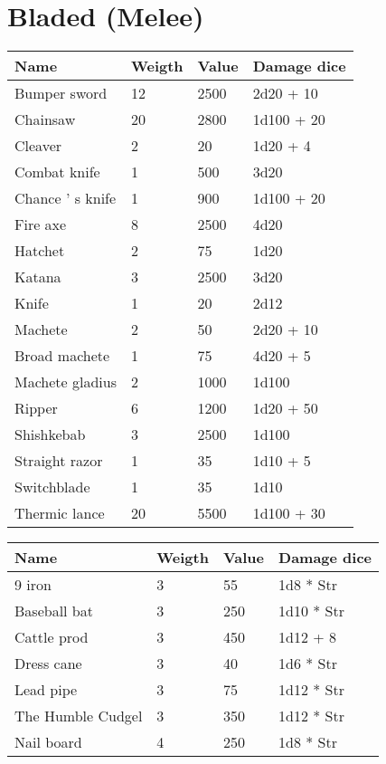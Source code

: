 \documentclass{report}
\begin{document}
\begin{table}[H]
\begin{table}[H]
\begin{table}[H]
\begin{table}[H]
\begin{table}[H]
\begin{table}[H]
\begin{table}[H]
\begin{table}[H]
\begin{table}[H]
\begin{table}[H]
\begin{table}[H]
\chapter{Bladed (Melee)}
\begin{table}[H]
  \centering
  \begin{tabular}{p{30mm}p{30mm}p{30mm}p{30mm}}
\bfseries Name & \bfseries Weigth & \bfseries Value & \bfseries Damage dice \\
\hline
Bumper sword  & 12 & 2500 & 2d20 + 10 \\
Chainsaw & 20 & 2800 & 1d100 + 20 \\
Cleaver  & 2 & 20 & 1d20 + 4 \\
Combat knife  & 1 & 500 & 3d20 \\
Chance ' s knife  & 1 & 900 & 1d100 + 20 \\
Fire axe  & 8 & 2500 & 4d20 \\
Hatchet  & 2 & 75 & 1d20 \\
Katana  & 3 & 2500 & 3d20 \\
Knife  & 1 & 20 & 2d12 \\
Machete  & 2 & 50 & 2d20 + 10 \\
Broad machete  & 1 & 75 & 4d20 + 5 \\
Machete gladius  & 2 & 1000 & 1d100  \\
Ripper  & 6 & 1200 & 1d20 + 50 \\
Shishkebab  & 3 & 2500 & 1d100 \\
Straight razor  & 1 & 35 & 1d10 + 5 \\
Switchblade  & 1 & 35 & 1d10 \\
Thermic lance  & 20 & 5500 & 1d100 + 30 \\
  \end{tabular}
\begin{table}[H]
  \centering
  \begin{tabular}{p{30mm}p{30mm}p{30mm}p{30mm}}
\bfseries Name & \bfseries Weigth & \bfseries Value & \bfseries Damage dice \\
\hline
9 iron  & 3 & 55 & 1d8 * Str \\
Baseball bat & 3 & 250 & 1d10 * Str \\
Cattle prod  & 3 & 450 & 1d12 + 8 \\
Dress cane  & 3 & 40 & 1d6 * Str \\
Lead pipe  & 3 & 75 & 1d12 * Str \\
The Humble Cudgel  & 3 & 350 & 1d12 * Str \\
Nail board  & 4 & 250 & 1d8 * Str \\

\end{tabular}
\end{table}
\end{table}
\end{table}
\end{table}
\end{table}
\end{table}
\end{table}
\end{table}
\end{table}
\end{table}
\end{table}
\end{table}
\end{table}
\end{document}

